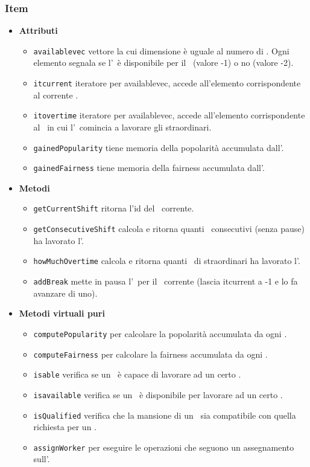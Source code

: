 \subsubsection{Item}
\begin{itemize}
    \item \textbf{Attributi}
    \begin{itemize}
        \item \texttt{available\textunderscore vec} vettore la cui dimensione è uguale al numero di \ttb. Ogni elemento segnala se l'\items\ è disponibile per il \ttb\ (valore -1) o no (valore -2).
        \item \texttt{it\textunderscore current} iteratore per available\textunderscore vec, accede all'elemento corrispondente al corrente \ttb.
        \item \texttt{it\textunderscore overtime} iteratore per available\textunderscore vec, accede all'elemento corrispondente al \ttb\ in cui l'\items\ comincia a lavorare gli straordinari.
        \item \texttt{gainedPopularity} tiene memoria della popolarità accumulata dall'\items.
        \item \texttt{gainedFairness} tiene memoria della fairness accumulata dall'\items.
    \end{itemize}
    \item \textbf{Metodi}
    \begin{itemize}
        \item \texttt{getCurrentShift} ritorna l'id del \ttb\ corrente.
        \item \texttt{getConsecutiveShift} calcola e ritorna quanti \ttb\ consecutivi (senza pause) ha lavorato l'\items.
        \item \texttt{howMuchOvertime} calcola e ritorna quanti \ttb\ di straordinari ha lavorato l'\items.
        \item \texttt{addBreak} mette in pausa l'\items\ per il \ttb\ corrente (lascia it\textunderscore current a -1 e lo fa avanzare di uno).
    \end{itemize}
\item \textbf{Metodi virtuali puri}
    \begin{itemize}
        \item \texttt{computePopularity} per calcolare la popolarità accumulata da ogni \items.
        \item \texttt{computeFairness} per calcolare la fairness accumulata da ogni \items.
        \item \texttt{is\textunderscore able} verifica se un \items\ è capace di lavorare ad un certo \task.
        \item \texttt{is\textunderscore available} verifica se un \items\ è disponibile per lavorare ad un certo \task.
        \item \texttt{isQualified} verifica che la mansione di un \items\ sia compatibile con quella richiesta per un \task.
        \item \texttt{assignWorker} per eseguire le operazioni che seguono un assegnamento sull'\items.
    \end{itemize}
\end{itemize}
    
